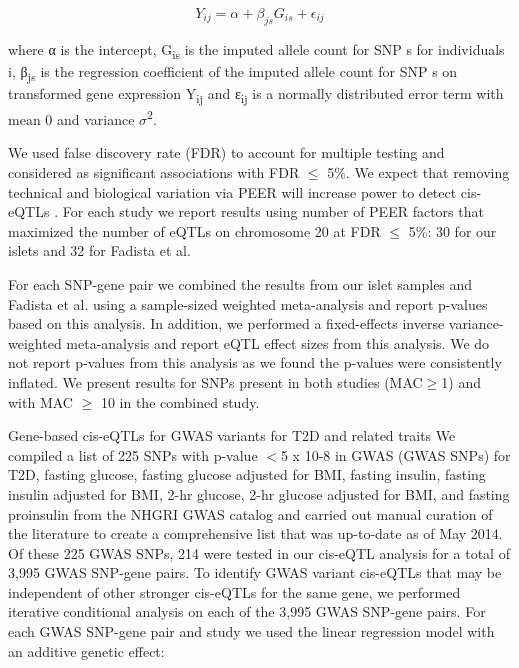 \[Y_{ij} = \alpha + \beta_{js}G_{is} + \epsilon_{ij} \]

where α is the intercept, G\textsubscript{is} is the imputed allele count for SNP s for individuals i, β\textsubscript{js} is the regression coefficient of the imputed allele count for SNP s on transformed gene expression Y\textsubscript{ij} and ε\textsubscript{ij} is a normally distributed error term with mean 0 and variance $\sigma$\textsuperscript{2}.
 
We used false discovery rate (FDR) \cite{storeyStatisticalSignificanceGenomewide2003} to account for multiple testing and considered as significant associations with FDR $\leq$ 5\%. We expect that removing technical and biological variation via PEER will increase power to detect cis-eQTLs \cite{scottGeneticRegulatorySignature2016}. For each study we report results using number of PEER factors that maximized the number of eQTLs on chromosome 20 at FDR $\leq$ 5\%: 30 for our islets and 32 for Fadista et al.

For each SNP-gene pair we combined the results from our islet samples and Fadista et al. using a sample-sized weighted meta-analysis \cite{willerMETALFastEfficient2010} and report p-values based on this analysis. In addition, we performed a fixed-effects inverse variance-weighted meta-analysis \cite{willerMETALFastEfficient2010} and report eQTL effect sizes from this analysis. We do not report p-values from this analysis as we found the p-values were consistently inflated. We present results for SNPs present in both studies (MAC$\geq$1) and with MAC $\geq$ 10 in the combined study.
 
Gene-based cis-eQTLs for GWAS variants for T2D and related traits
We compiled a list of 225 SNPs with p-value $<$5 x 10-8 in GWAS (GWAS SNPs) for T2D, fasting glucose, fasting glucose adjusted for BMI, fasting insulin, fasting insulin adjusted for BMI, 2-hr glucose, 2-hr glucose adjusted for BMI, and fasting proinsulin from the NHGRI GWAS catalog \cite{welterNHGRIGWASCatalog2014} and carried out manual curation of the literature to create a comprehensive list that was up-to-date as of May 2014. Of these 225 GWAS SNPs, 214 were tested in our cis-eQTL analysis for a total of 3,995 GWAS SNP-gene pairs. To identify GWAS variant cis-eQTLs that may be independent of other stronger cis-eQTLs for the same gene, we performed iterative conditional analysis on each of the 3,995 GWAS SNP-gene pairs. For each GWAS SNP-gene pair and study we used the linear regression model with an additive genetic effect:


